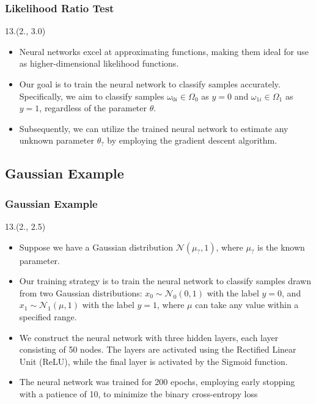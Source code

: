 \documentclass[12pt, xcolor={dvipsnames}, aspectratio = 169, sans,mathserif]{beamer}
\newenvironment{List}[2]
{\begin{textblock}{#1}#2
\begin{itemize}}
{\end{itemize}
\end{textblock}}
\newcommand{\NPcite}[1]{{\tiny \footfullcite{#1}}}
\begin{document}
\begin{frame}
\frametitle{Likelihood Ratio Test}

\begin{List}{13.}{(2., 3.0)}

  \item Neural networks excel at approximating functions, making them ideal for use as higher-dimensional likelihood functions.

  \item Our goal is to train the neural network to classify samples accurately. Specifically, we aim to classify samples
  $\omega_{0i} \in \Omega_0$ as $y = 0$ and $\omega_{1i} \in \Omega_1$ as $y = 1$, regardless of the parameter $\theta$.

  \item Subsequently, we can utilize the trained neural network to estimate any unknown parameter $\theta_?$ by employing
  the gradient descent algorithm.\NPcite{Andreassen:2019nnm}

\end{List}

\end{frame}

\subsection{Gaussian Example}

\begin{frame}
\frametitle{Gaussian Example}

\begin{List}{13.}{(2., 2.5)}

  \item Suppose we have a Gaussian distribution $\mathcal{N}(\mu_{\text{?}}, 1)$, where $\mu_{\text{?}}$ is the known parameter.

  \item Our training strategy is to train the neural network to classify samples drawn from two Gaussian distributions:
  $x_{0} \sim \mathcal{N}_{0}(0, 1)$ with the label $y = 0$, and $x_{1} \sim \mathcal{N}_{1}(\mu, 1)$ with the label $y = 1$,
  where $\mu$ can take any value within a specified range.

  \item We construct the neural network with three hidden layers, each layer consisting of 50 nodes.
  The layers are activated using the Rectified Linear Unit (ReLU), while the final layer is activated by the Sigmoid function.

  \item The neural network was trained for 200 epochs, employing early stopping with a patience of 10, to minimize the
  binary cross-entropy loss

\end{List}

\end{frame}
\end{document}
